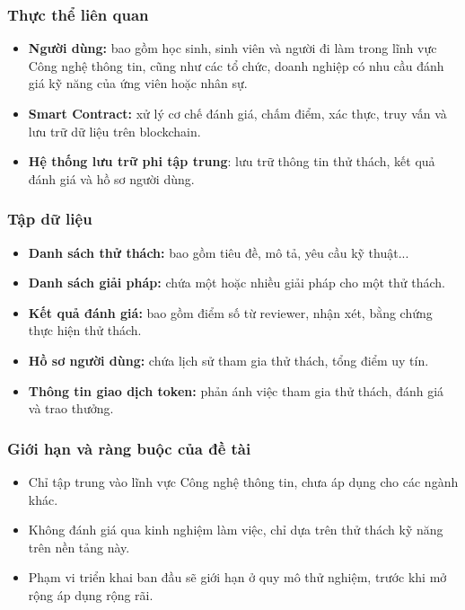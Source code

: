 \documentclass{article}[14pt]
\begin{document}
{    \subsubsection{Thực thể liên quan}
    \begin{itemize}
        \item \textbf{Người dùng:} bao gồm học sinh, sinh viên và người đi làm trong lĩnh vực Công nghệ thông tin, cũng như các tổ chức, doanh nghiệp có nhu cầu đánh giá kỹ năng của ứng viên hoặc nhân sự.
        \item \textbf{Smart Contract:} xử lý cơ chế đánh giá, chấm điểm, xác thực, truy vấn và lưu trữ dữ liệu trên blockchain.
        \item \textbf{Hệ thống lưu trữ phi tập trung}: lưu trữ thông tin thử thách, kết quả đánh giá và hồ sơ người dùng.
    \end{itemize}

    \subsubsection{Tập dữ liệu}
    \begin{itemize}
        \item \textbf{Danh sách thử thách:} bao gồm tiêu đề, mô tả, yêu cầu kỹ thuật...
        \item \textbf{Danh sách giải pháp:} chứa một hoặc nhiều giải pháp cho một thử thách.
        \item \textbf{Kết quả đánh giá:} bao gồm điểm số từ reviewer, nhận xét, bằng chứng thực hiện thử thách.
        \item \textbf{Hồ sơ người dùng:} chứa lịch sử tham gia thử thách, tổng điểm uy tín.
        \item \textbf{Thông tin giao dịch token:} phản ánh việc tham gia thử thách, đánh giá và trao thưởng.
    \end{itemize}

    \subsubsection{Giới hạn và ràng buộc của đề tài}
    \begin{itemize}
        \item Chỉ tập trung vào lĩnh vực Công nghệ thông tin, chưa áp dụng cho các ngành khác.
        \item Không đánh giá qua kinh nghiệm làm việc, chỉ dựa trên thử thách kỹ năng trên nền tảng này.
        \item Phạm vi triển khai ban đầu sẽ giới hạn ở quy mô thử nghiệm, trước khi mở rộng áp dụng rộng rãi.
    \end{itemize}

}
\end{document}
